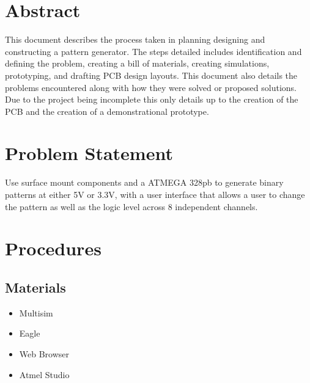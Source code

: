 \documentclass[12pt]{article}
\begin{document}
    
    \tableofcontents
    \listoffigures
    \newpage

    \section{Abstract}

    This document describes the process taken in planning designing and constructing a pattern generator. The steps detailed includes identification and defining the problem, creating a bill of materials, creating simulations, prototyping, and drafting PCB design layouts. This document also details the problems encountered along with how they were solved or proposed solutions. Due to the project being incomplete this only details up to the creation of the PCB and the creation of a demonstrational prototype.

    \section{Problem Statement}

    Use surface mount components and a ATMEGA 328pb to generate binary patterns at either 5V or 3.3V, with a user interface that allows a user to change the pattern as well as the logic level across 8 independent channels. 

    \section{Procedures}
        \subsection{Materials}

            \begin{itemize}
                \item Multisim
                \item Eagle
                \item Web Browser
                \item Atmel Studio
            \end{itemize}
\end{document}
